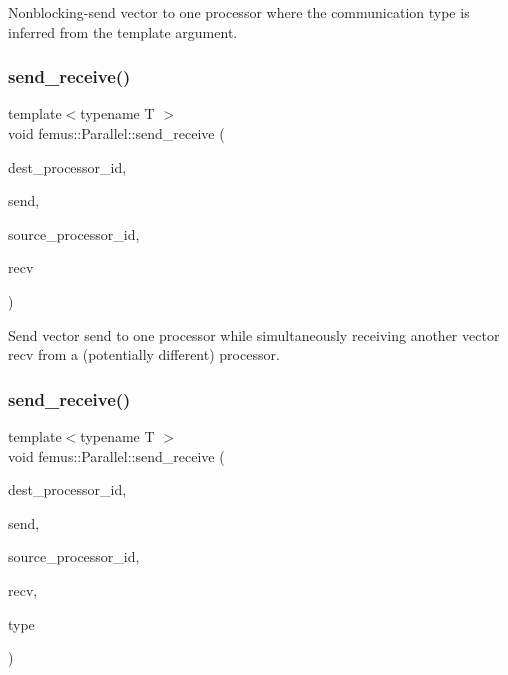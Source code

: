 Nonblocking-\/send vector to one processor where the communication type is inferred from the template argument. \mbox{\label{namespacefemus_1_1_parallel_aa92d91cc52cf504bcd046ed47b6e390b}} 
\subsubsection{\texorpdfstring{send\+\_\+receive()}{send\_receive()}\hspace{0.1cm}{\footnotesize\ttfamily [1/2]}}
{\footnotesize\ttfamily template$<$typename T $>$ \\
void femus\+::\+Parallel\+::send\+\_\+receive (\begin{DoxyParamCaption}\item[{const unsigned int}]{dest\+\_\+processor\+\_\+id,  }\item[{T \&}]{send,  }\item[{const unsigned int}]{source\+\_\+processor\+\_\+id,  }\item[{T \&}]{recv }\end{DoxyParamCaption})\hspace{0.3cm}{\ttfamily [inline]}}

Send vector {\ttfamily send} to one processor while simultaneously receiving another vector {\ttfamily recv} from a (potentially different) processor. \mbox{\label{namespacefemus_1_1_parallel_a9a1e9e24951897be2b28dbc25e7e578c}} 
\subsubsection{\texorpdfstring{send\+\_\+receive()}{send\_receive()}\hspace{0.1cm}{\footnotesize\ttfamily [2/2]}}
{\footnotesize\ttfamily template$<$typename T $>$ \\
void femus\+::\+Parallel\+::send\+\_\+receive (\begin{DoxyParamCaption}\item[{const unsigned int}]{dest\+\_\+processor\+\_\+id,  }\item[{T \&}]{send,  }\item[{const unsigned int}]{source\+\_\+processor\+\_\+id,  }\item[{T \&}]{recv,  }\item[{const \mbox{\hyperlink{classfemus_1_1_parallel_1_1_data_type}{Data\+Type}} \&}]{type }\end{DoxyParamCaption})\hspace{0.3cm}{\ttfamily [inline]}}

